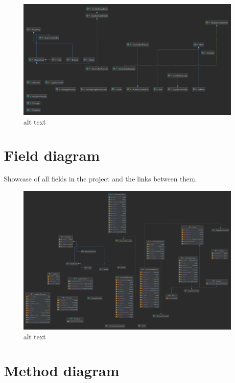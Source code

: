 \documentclass[
]{report}
\begin{document}
\begin{figure}
\centering
\includegraphics{diagrams/classDiagram.png}
\caption{alt text}
\end{figure}

\hypertarget{field-diagram}{%
\section{Field diagram}\label{field-diagram}}

Showcase of all fields in the project and the links between them.

\begin{figure}
\centering
\includegraphics{diagrams/fieldDiagram.png}
\caption{alt text}
\end{figure}

\hypertarget{method-diagram}{%
\section{Method diagram}\label{method-diagram}}
\end{document}
